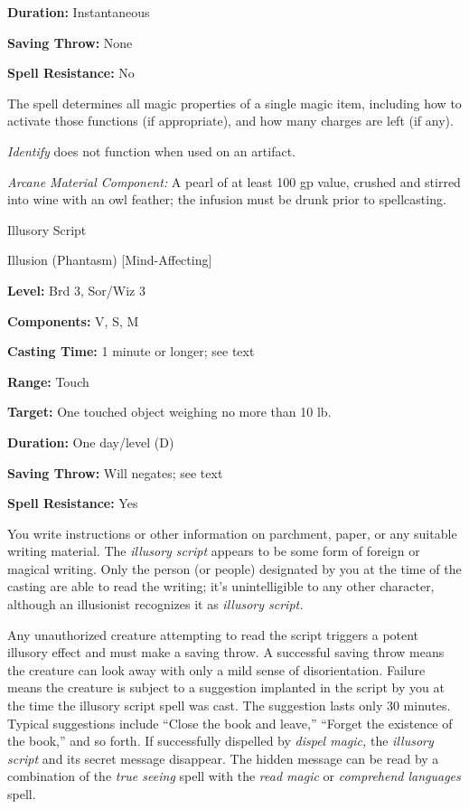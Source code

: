 \documentclass{article}
\begin{document}
\textbf{Duration:} Instantaneous

\textbf{Saving Throw:} None

\textbf{Spell Resistance:} No

The spell determines all magic properties of a single magic item, including how 
to activate those functions (if appropriate), and how many charges are left (if 
any).

\textit{Identify }does not function when used on an artifact.

\textit{Arcane Material Component: }A pearl of at least 100 gp value, crushed and 
stirred into wine with an owl feather; the infusion must be drunk prior to spellcasting.

\vspace{12pt}
Illusory Script

Illusion (Phantasm) [Mind-Affecting]

\textbf{Level:} Brd 3, Sor/Wiz 3

\textbf{Components:} V, S, M

\textbf{Casting Time:} 1 minute or longer; see text

\textbf{Range:} Touch

\textbf{Target:} One touched object weighing no more than 10 lb.

\textbf{Duration:} One day/level (D)

\textbf{Saving Throw: }Will negates; see text

\textbf{Spell Resistance:} Yes

You write instructions or other information on parchment, paper, or any suitable 
writing material. The \textit{illusory script }appears to be some form of foreign 
or magical writing. Only the person (or people) designated by you at the time of 
the casting are able to read the writing; it's unintelligible to any other character, 
although an illusionist recognizes it as \textit{illusory script.}

Any unauthorized creature attempting to read the script triggers a potent illusory 
effect and must make a saving throw. A successful saving throw means the creature 
can look away with only a mild sense of disorientation. Failure means the creature 
is subject to a suggestion implanted in the script by you at the time the illusory 
script spell was cast. The suggestion lasts only 30 minutes. Typical suggestions 
include ``Close the book and leave,'' ``Forget the existence of the book,'' and 
so forth. If successfully dispelled by \textit{dispel magic, }the \textit{illusory 
script }and its secret message disappear. The hidden message can be read by a combination 
of the \textit{true seeing }spell with the \textit{read magic }or \textit{comprehend 
languages }spell.
\end{document}
